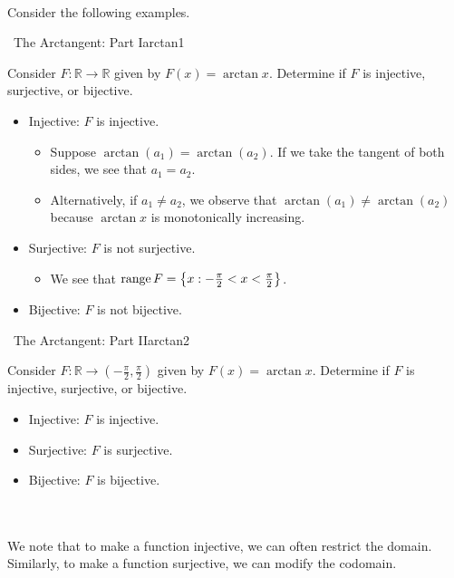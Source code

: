     \\
    Consider the following examples.
    \begin{example}{\Difficulty\,\Difficulty\,\,The Arctangent: Part I}{arctan1}
        
        Consider \(F:\mathbb{R}\to\mathbb{R}\) given by \(F(x)=\arctan x\). Determine if \(F\) is injective, surjective, or bijective.
        \begin{itemize}
            \item Injective: \(F\) is injective.
            \begin{itemize}
                \item Suppose \(\arctan(a_1)=\arctan(a_2)\). If we take the tangent of both sides, we see that \(a_1=a_2\).
                \item Alternatively, if \(a_1\neq a_2\), we observe that \(\arctan(a_1)\neq\arctan(a_2)\) because \(\arctan x\) is monotonically increasing.
            \end{itemize}
            \item Surjective: \(F\) is not surjective.
            \begin{itemize}
                \item We see that \(\text{range\,} F=\left\{x:-\frac{\pi}{2}<x<\frac{\pi}{2}\right\}\).
            \end{itemize}
            \item Bijective: \(F\) is not bijective.
        \end{itemize}
    \end{example}
    \begin{example}{\Difficulty\,\Difficulty\,\,The Arctangent: Part II}{arctan2}
        
        Consider \(F:\mathbb{R}\to\left(-\frac{\pi}{2},\frac{\pi}{2}\right)\) given by \(F(x)=\arctan x\). Determine if \(F\) is injective, surjective, or bijective.
        \begin{itemize}
            \item Injective: \(F\) is injective.
            \item Surjective: \(F\) is surjective.
            \item Bijective: \(F\) is bijective.
        \end{itemize}
    
    \end{example}
    \vphantom
    \\
    \\
    We note that to make a function injective, we can often restrict the domain. Similarly, to make a function surjective, we can modify the codomain.
    
